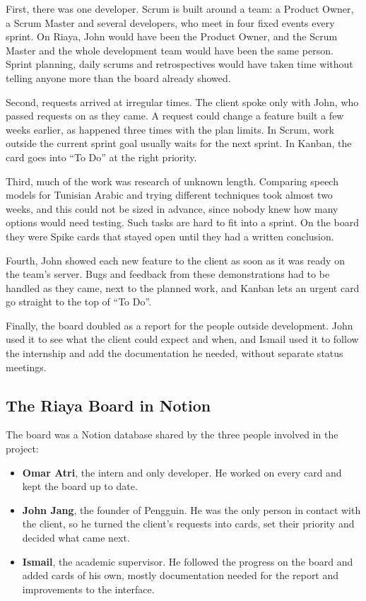 First, there was one developer. Scrum is built around a team: a Product Owner, a Scrum Master and several developers, who meet in four fixed events every sprint. On Riaya, John would have been the Product Owner, and the Scrum Master and the whole development team would have been the same person. Sprint planning, daily scrums and retrospectives would have taken time without telling anyone more than the board already showed.

Second, requests arrived at irregular times. The client spoke only with John, who passed requests on as they came. A request could change a feature built a few weeks earlier, as happened three times with the plan limits. In Scrum, work outside the current sprint goal usually waits for the next sprint. In Kanban, the card goes into ``To Do'' at the right priority.

Third, much of the work was research of unknown length. Comparing speech models for Tunisian Arabic and trying different techniques took almost two weeks, and this could not be sized in advance, since nobody knew how many options would need testing. Such tasks are hard to fit into a sprint. On the board they were Spike cards that stayed open until they had a written conclusion.

Fourth, John showed each new feature to the client as soon as it was ready on the team's server. Bugs and feedback from these demonstrations had to be handled as they came, next to the planned work, and Kanban lets an urgent card go straight to the top of ``To Do''.

Finally, the board doubled as a report for the people outside development. John used it to see what the client could expect and when, and Ismail used it to follow the internship and add the documentation he needed, without separate status meetings.

\subsection{The Riaya Board in Notion}
The board was a Notion database shared by the three people involved in the project:

\begin{itemize}
    \item \textbf{Omar Atri}, the intern and only developer. He worked on every card and kept the board up to date.
    \item \textbf{John Jang}, the founder of Pengguin. He was the only person in contact with the client, so he turned the client's requests into cards, set their priority and decided what came next.
    \item \textbf{Ismail}, the academic supervisor. He followed the progress on the board and added cards of his own, mostly documentation needed for the report and improvements to the interface.
\end{itemize}

